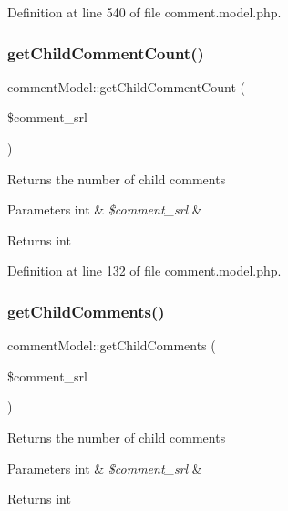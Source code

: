 Definition at line 540 of file comment.\+model.\+php.

\hypertarget{classcommentModel_adfb890eecf72a039c9f7a28c1e6eb3d2}{}\label{classcommentModel_adfb890eecf72a039c9f7a28c1e6eb3d2} 
\subsubsection{\texorpdfstring{get\+Child\+Comment\+Count()}{getChildCommentCount()}}
{\footnotesize\ttfamily comment\+Model\+::get\+Child\+Comment\+Count (\begin{DoxyParamCaption}\item[{}]{\$comment\+\_\+srl }\end{DoxyParamCaption})}

Returns the number of child comments 
\begin{DoxyParams}[1]{Parameters}
int & {\em \$comment\+\_\+srl} & \\
\hline
\end{DoxyParams}
\begin{DoxyReturn}{Returns}
int 
\end{DoxyReturn}


Definition at line 132 of file comment.\+model.\+php.

\hypertarget{classcommentModel_ac1acb7d6d8da68e20ec5e6e5a55e5d32}{}\label{classcommentModel_ac1acb7d6d8da68e20ec5e6e5a55e5d32} 
\subsubsection{\texorpdfstring{get\+Child\+Comments()}{getChildComments()}}
{\footnotesize\ttfamily comment\+Model\+::get\+Child\+Comments (\begin{DoxyParamCaption}\item[{}]{\$comment\+\_\+srl }\end{DoxyParamCaption})}

Returns the number of child comments 
\begin{DoxyParams}[1]{Parameters}
int & {\em \$comment\+\_\+srl} & \\
\hline
\end{DoxyParams}
\begin{DoxyReturn}{Returns}
int 
\end{DoxyReturn}


